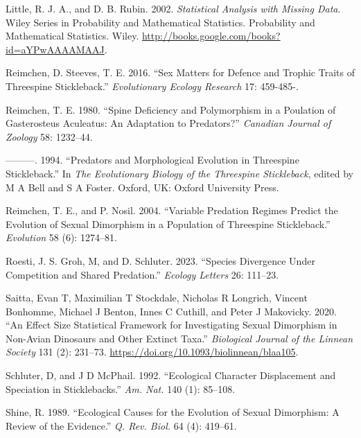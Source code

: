 \documentclass[
  12pt,
]{article}
\newlength{\cslhangindent}
\newlength{\cslentryspacingunit} %
\newenvironment{CSLReferences}[2] %
 {%
  \setlength{\parindent}{0pt}
  \ifodd #1
  \let\oldpar\par
  \def\par{\hangindent=\cslhangindent\oldpar}
  \fi
  \setlength{\parskip}{#2\cslentryspacingunit}
 }%
 {}
\begin{document}
\begin{CSLReferences}{1}{0}
\leavevmode{}%
Little, R. J. A., and D. B. Rubin. 2002. \emph{Statistical Analysis with
Missing Data}. Wiley Series in Probability and Mathematical Statistics.
Probability and Mathematical Statistics. Wiley.
\url{http://books.google.com/books?id=aYPwAAAAMAAJ}.

\leavevmode{}%
Reimchen, D. Steeves, T. E. 2016. {``Sex Matters for Defence and Trophic
Traits of Threespine Stickleback.''} \emph{Evolutionary Ecology
Research} 17: 459-485-.

\leavevmode{}%
Reimchen, T. E. 1980. {``Spine Deficiency and Polymorphism in a
Poulation of Gasterosteus Aculeatus: An Adaptation to Predators?''}
\emph{Canadian Journal of Zoology} 58: 1232--44.

\leavevmode{}%
---------. 1994. {``Predators and Morphological Evolution in Threespine
Stickleback.''} In \emph{The Evolutionary Biology of the Threespine
Stickleback}, edited by M A Bell and S A Foster. Oxford, UK: Oxford
University Press.

\leavevmode{}%
Reimchen, T. E., and P. Nosil. 2004. {``Variable Predation Regimes
Predict the Evolution of Sexual Dimorphism in a Population of Threespine
Stickleback.''} \emph{Evolution} 58 (6): 1274--81.

\leavevmode{}%
Roesti, J. S. Groh, M, and D. Schluter. 2023. {``Species Divergence
Under Competition and Shared Predation.''} \emph{Ecology Letters} 26:
111--23.

\leavevmode{}%
Saitta, Evan T, Maximilian T Stockdale, Nicholas R Longrich, Vincent
Bonhomme, Michael J Benton, Innes C Cuthill, and Peter J Makovicky.
2020. {``An Effect Size Statistical Framework for Investigating Sexual
Dimorphism in Non-Avian Dinosaurs and Other Extinct Taxa.''}
\emph{Biological Journal of the Linnean Society} 131 (2): 231--73.
\url{https://doi.org/10.1093/biolinnean/blaa105}.

\leavevmode{}%
Schluter, D, and J D McPhail. 1992. {``Ecological Character Displacement
and Speciation in Sticklebacks.''} \emph{Am. Nat.} 140 (1): 85--108.

\leavevmode{}%
Shine, R. 1989. {``Ecological Causes for the Evolution of Sexual
Dimorphism: A Review of the Evidence.''} \emph{Q. Rev. Biol.} 64 (4):
419--61.


\end{CSLReferences}
\end{document}
